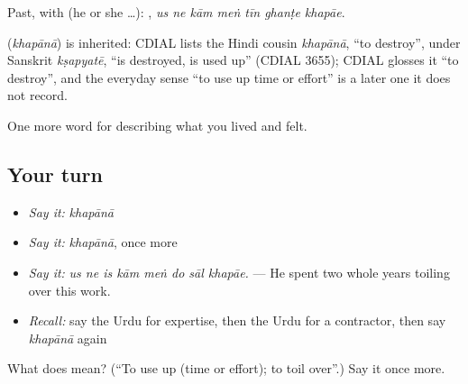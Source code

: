 Past, with  (he or she …):       , \emph{us ne kām meṅ tīn ghanṭe khapāe}.

\begin{cousinweb}
\textbf{} (\emph{khapānā}) is inherited: CDIAL lists the Hindi cousin \emph{khapānā}, \textquotedblleft{}to destroy\textquotedblright{}, under Sanskrit \emph{kṣapyatē}, \textquotedblleft{}is destroyed, is used up\textquotedblright{} (CDIAL 3655); CDIAL glosses it \textquotedblleft{}to destroy\textquotedblright{}, and the everyday sense \textquotedblleft{}to use up time or effort\textquotedblright{} is a later one it does not record.
\end{cousinweb}

\begin{grammarlens}[title={What you've built}]
One more word for describing what you lived and felt.
\end{grammarlens}

\subsection*{Your turn}
\begin{itemize}
\raggedright
  \item \emph{Say it:} \emph{khapānā}
  \item \emph{Say it:} \emph{khapānā}, once more
  \item \emph{Say it:} \emph{us ne is kām meṅ do sāl khapāe.} — He spent two whole years toiling over this work.
  \item \emph{Recall:} say the Urdu for expertise, then the Urdu for a contractor, then say \emph{khapānā} again
\end{itemize}

\begin{tcolorbox}[breakable,colback=teal!4,colframe=teal!35!black,title={Before you move on}]
What does  mean? (\textquotedblleft{}To use up (time or effort); to toil over\textquotedblright{}.) Say it once more.
\end{tcolorbox}
